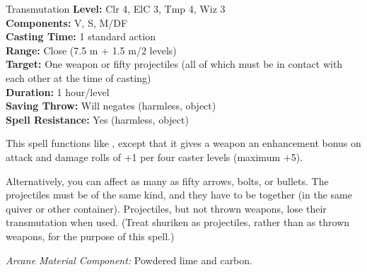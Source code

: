 {Transmutation}
{
	\textbf{Level:}
	Clr 4, ElC 3, Tmp 4, Wiz 3\\
	\textbf{Components:}
	V, S, M/DF\\
	\textbf{Casting Time:}
	1 standard action\\
	\textbf{Range:}
	Close (7.5 m + 1.5 m/2 levels)\\
	\textbf{Target:}
	One weapon or fifty projectiles (all of which must be in contact with each other at the time of casting)\\
	\textbf{Duration:}
	1 hour/level\\
	\textbf{Saving Throw:}
	Will negates (harmless, object)\\
	\textbf{Spell Resistance:}
	Yes (harmless, object)\\
}
{
	This spell functions like , except that it gives a weapon an enhancement bonus on attack and damage rolls of +1 per four caster levels (maximum +5).

	Alternatively, you can affect as many as fifty arrows, bolts, or bullets. The projectiles must be of the same kind, and they have to be together (in the same quiver or other container). Projectiles, but not thrown weapons, lose their transmutation when used. (Treat shuriken as projectiles, rather than as thrown weapons, for the purpose of this spell.)

	\textit{Arcane Material Component:}
	Powdered lime and carbon.

}
